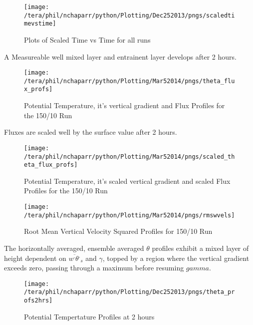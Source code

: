 \begin{figure}[!ht]
    \centering
    \texttt{[image: /tera/phil/nchaparr/python/Plotting/Dec252013/pngs/scaledtimevstime]}
    \caption{Plots of Scaled Time vs Time for all runs}
    \label{fig:ScaledTimevsTime}   %
\end{figure}

A Measureable well mixed layer and entrainent layer develops after 2 hours.

\begin{figure}[!ht]
    \centering
    \texttt{[image: /tera/phil/nchaparr/python/Plotting/Mar52014/pngs/theta\_flux\_profs]}
    \caption{Potential Temperature, it's vertical gradient and Flux Profiles for the 150/10 Run}
    \label{fig:tempgradfluxprofs15010}   %
\end{figure}

Fluxes are scaled well by the surface value after 2 hours.


\begin{figure}[!ht]
    \centering
    \texttt{[image: /tera/phil/nchaparr/python/Plotting/Mar52014/pngs/scaled\_theta\_flux\_profs]}
    \caption{Potential Temperature, it's scaled vertical gradient and scaled Flux Profiles for the 150/10 Run}
    \label{fig:scaledtempgradfluxprofs15010}   %
\end{figure}

\begin{figure}[!ht]
    \centering
    \texttt{[image: /tera/phil/nchaparr/python/Plotting/Mar52014/pngs/rmswvels]}
    \caption{Root Mean Vertical Velocity Squared Profiles for 150/10 Run}
    \label{fig:rmswvelprofs15010}   %
\end{figure}


The horizontally averaged, ensemble averaged $\theta$ profiles exhibit a mixed layer of height dependent on
$\overline{w^{,}\theta^{,}}_{s}$ and $\gamma$, topped by a region where the vertical gradient exceeds zero,
passing through a maximum before resuming $gamma$.

\begin{figure}[!ht]
    \centering
    \texttt{[image: /tera/phil/nchaparr/python/Plotting/Dec252013/pngs/theta\_profs2hrs]}
    \caption{Potential Tempertature Profiles at 2 hours}
    \label{fig:pottempprofs2hrs}   %
\end{figure}

